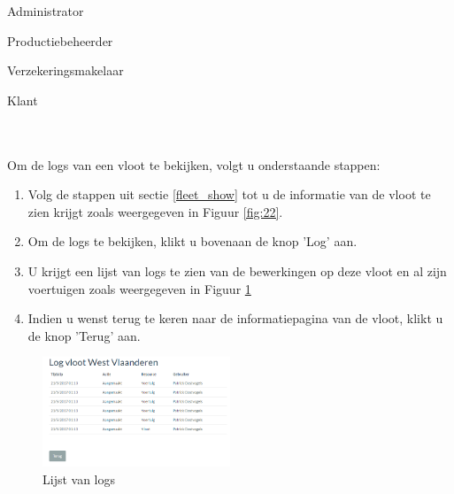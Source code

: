 \documentclass[11pt,openany]{article}
\newcommand{\cmark}{\ding{51}}%
\newcommand{\xmark}{\ding{55}}%
\newcommand{\done}{\rlap{$\square$}{\raisebox{2pt}{\large\hspace{1pt}\cmark}}%
	\hspace{-2.5pt}}
\newcommand{\wontfix}{\rlap{$\square$}{\large\hspace{1pt}\xmark}}
\begin{document}
\begin{todolist}
	\item[\done] Administrator
	\item[\done] Productiebeheerder
	\item[\done] Verzekeringsmakelaar
	\item[\wontfix] Klant 
\end{todolist}
\\
\\
Om de logs van een vloot te bekijken, volgt u onderstaande stappen:
\begin{enumerate}
	\item  Volg de stappen uit sectie \ref{fleet_show} tot u de informatie van de vloot te zien krijgt zoals weergegeven in Figuur \ref{fig:22}.
	\item Om de logs te bekijken, klikt u bovenaan de knop 'Log' aan.
	\item U krijgt een lijst van logs te zien van de bewerkingen op deze vloot en al zijn voertuigen zoals weergegeven in Figuur \ref{fig:24}
	\item Indien u wenst terug te keren naar de informatiepagina van de vloot, klikt u de knop 'Terug' aan.
\end{enumerate}

\begin{figure}
	\centering
	\includegraphics[width=0.5\textwidth]{img/fig24.png}
	\caption{Lijst van logs} 
	\label{fig:24} 
\end{figure}
\end{document}

